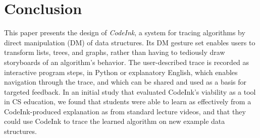 \section{Conclusion}

This paper presents the design of \emph{CodeInk}, a system for
tracing algorithms by direct manipulation (DM) of data structures. Its
DM gesture set enables users to transform lists, trees, and graphs,
rather than having to tediously draw storyboards of an algorithm's
behavior. The user-described trace is recorded
as interactive program steps, in Python or explanatory English, which
enables navigation through the trace, and which can be shared and used as a
basis for targeted feedback. In an initial study that evaluated
CodeInk's viability as a tool in CS education, we found that students
were able to learn as effectively from a CodeInk-produced explanation as
from standard lecture videos, and that they could use CodeInk to trace
the learned algorithm on new example data structures.


